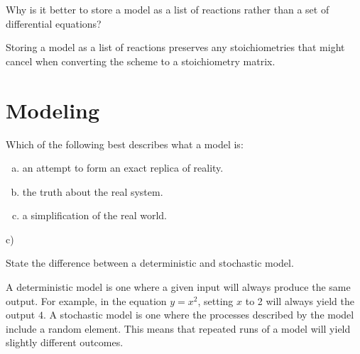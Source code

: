 \documentclass[12pt]{article}
\begin{document}
\begin{question}
Why is it better to store a model as a list of reactions rather than a set of differential equations?
\end{question}
\begin{solution}
Storing a model as a list of reactions preserves any stoichiometries that might cancel when converting the scheme to a stoichiometry matrix.
\end{solution}




\section{Modeling}

\begin{question}
Which of the following best describes what a model is:
\begin{enumerate}[a)]
\item an attempt to form an exact replica of reality.
\item the truth about the real system.
\item a simplification of the real world.
\end{enumerate}
\end{question}
\begin{solution}
c)
\end{solution}


\begin{question}
State the difference between a deterministic and stochastic model.
\end{question}
\begin{solution}
A deterministic model is one where a given input will always produce the same output. For example, in the equation $y = x^2$, setting $x$ to 2 will always yield the output $4$. A stochastic model is one where the processes described by the model include a random element. This means that repeated runs of a model will yield slightly different outcomes.
\end{solution}
\end{document}
